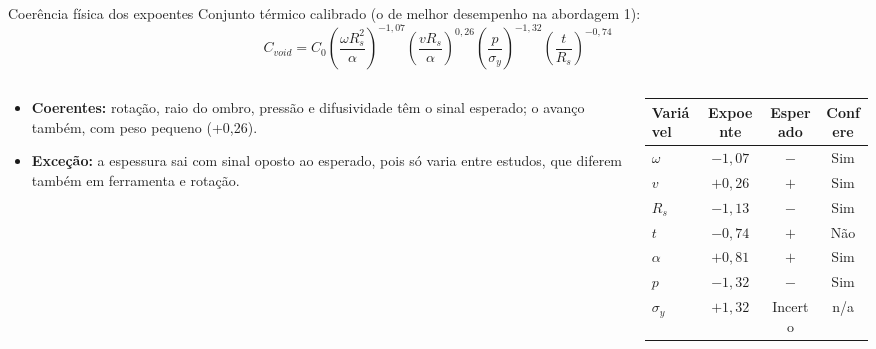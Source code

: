 \documentclass[aspectratio=169,11pt]{beamer}
\newenvironment{bullets}{\begin{itemize}\setlength{\itemsep}{5pt}}{\end{itemize}}
\begin{document}
\begin{frame}{Coerência física dos expoentes}
{\small Conjunto térmico calibrado (o de melhor desempenho na abordagem 1):}
\[ C_{void} = C_0 \left(\frac{\omega R_{s}^{2}}{\alpha}\right)^{-1{,}07}\left(\frac{vR_s}{\alpha}\right)^{0{,}26}\left(\frac{p}{\sigma_y}\right)^{-1{,}32}\left(\frac{t}{R_s}\right)^{-0{,}74} \]
\begin{columns}[T,onlytextwidth]
\begin{column}{0.52\textwidth}
\begin{bullets}
  \item \textbf{Coerentes:} rotação, raio do ombro, pressão e difusividade têm o sinal esperado; o avanço também, com peso pequeno (+0,26).
  \item \textbf{Exceção:} a espessura sai com sinal oposto ao esperado, pois só varia entre estudos, que diferem também em ferramenta e rotação.
\end{bullets}
\end{column}
\begin{column}{0.45\textwidth}
\centering\scriptsize\setlength{\tabcolsep}{3pt}
\begin{tabular}{lccc}
\toprule
\textbf{Variável} & \textbf{Expoente} & \textbf{Esperado} & \textbf{Confere} \\ \midrule
$\omega$ & $-1{,}07$ & $-$ & Sim \\
$v$ & $+0{,}26$ & $+$ & Sim \\
$R_s$ & $-1{,}13$ & $-$ & Sim \\
$t$ & $-0{,}74$ & $+$ & Não \\
$\alpha$ & $+0{,}81$ & $+$ & Sim \\
$p$ & $-1{,}32$ & $-$ & Sim \\
$\sigma_y$ & $+1{,}32$ & Incerto & n/a \\ \bottomrule
\end{tabular}
\end{column}
\end{columns}
\end{frame}
\end{document}
